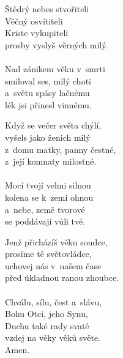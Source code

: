 \begin{translatioMulticol}{3}
Štědrý nebes stvořiteli\\
Věčný osvítiteli\\
Kriste vykupiteli\\
prosby vyslyš věrných milý.\\
\\
Nad zánikem věku v~smrti\\
smiloval ses, milý choti\\
a~světu spásy lačnému\\
lék jsi přinesl vinnému.\columnbreak

Když se večer světa chýlí,\\
vyšels jako ženich milý\\
z~domu matky, panny čestné,\\
z~její komnaty milostné.\\
\\
Mocí tvojí velmi silnou\\
kolena se k~zemi ohnou\\
a~nebe, země tvorové\\
se poddávají vůli tvé.\columnbreak

Jenž přicházíš věku soudce,\\
prosíme tě světovládce,\\
uchovej nás v~našem čase\\
před úkladnou ranou zhoubce.\\
\\
Chválu, sílu, čest a~slávu,\\
Bohu Otci, jeho Synu,\\
Duchu také rady svaté\\
vzdej na věky věků světe.\\
Amen.
\end{translatioMulticol}
